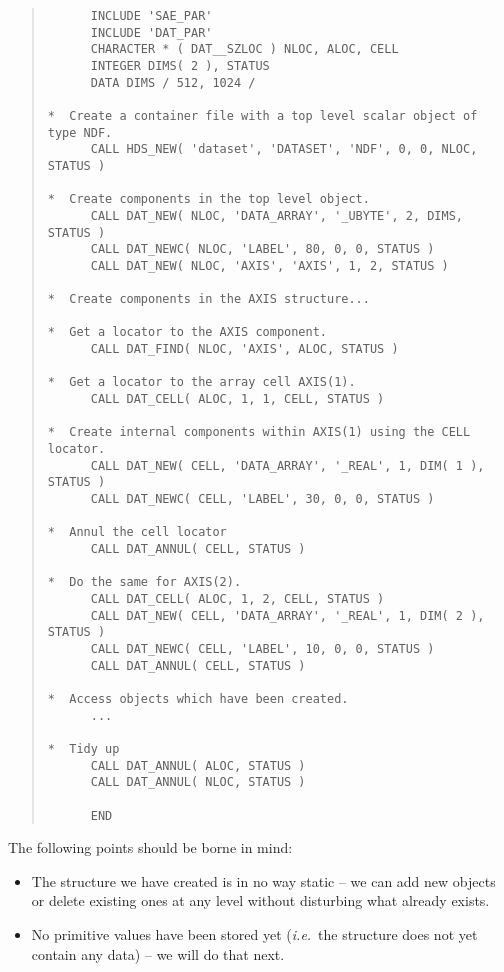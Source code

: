 \documentclass[twoside,11pt]{article}
\renewcommand{\_}{\texttt{\symbol{95}}}
\newcommand{\st}[1]{{\em{#1}}}
\begin{document}
\small
\begin{quote}
\begin{verbatim}
      INCLUDE 'SAE_PAR'
      INCLUDE 'DAT_PAR'
      CHARACTER * ( DAT__SZLOC ) NLOC, ALOC, CELL
      INTEGER DIMS( 2 ), STATUS
      DATA DIMS / 512, 1024 /

*  Create a container file with a top level scalar object of type NDF.
      CALL HDS_NEW( 'dataset', 'DATASET', 'NDF', 0, 0, NLOC, STATUS )

*  Create components in the top level object.
      CALL DAT_NEW( NLOC, 'DATA_ARRAY', '_UBYTE', 2, DIMS, STATUS )
      CALL DAT_NEWC( NLOC, 'LABEL', 80, 0, 0, STATUS )
      CALL DAT_NEW( NLOC, 'AXIS', 'AXIS', 1, 2, STATUS )

*  Create components in the AXIS structure...

*  Get a locator to the AXIS component.
      CALL DAT_FIND( NLOC, 'AXIS', ALOC, STATUS )

*  Get a locator to the array cell AXIS(1).
      CALL DAT_CELL( ALOC, 1, 1, CELL, STATUS )

*  Create internal components within AXIS(1) using the CELL locator.
      CALL DAT_NEW( CELL, 'DATA_ARRAY', '_REAL', 1, DIM( 1 ), STATUS )
      CALL DAT_NEWC( CELL, 'LABEL', 30, 0, 0, STATUS )

*  Annul the cell locator
      CALL DAT_ANNUL( CELL, STATUS )

*  Do the same for AXIS(2).
      CALL DAT_CELL( ALOC, 1, 2, CELL, STATUS )
      CALL DAT_NEW( CELL, 'DATA_ARRAY', '_REAL', 1, DIM( 2 ), STATUS )
      CALL DAT_NEWC( CELL, 'LABEL', 10, 0, 0, STATUS )
      CALL DAT_ANNUL( CELL, STATUS )

*  Access objects which have been created.
      ...

*  Tidy up
      CALL DAT_ANNUL( ALOC, STATUS )
      CALL DAT_ANNUL( NLOC, STATUS )

      END
\end{verbatim}
\end{quote}
\normalsize

The following points should be borne in mind:

\begin{itemize}

\item The structure we have created is in no way static -- we can add
new objects or delete existing ones at any level without disturbing
what already exists.

\item No primitive values have been stored yet (\st{i.e.}\ the
structure does not yet contain any data) -- we will do that next.

\end{itemize}
\end{document}
